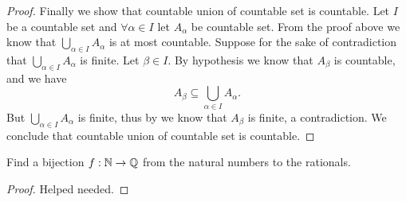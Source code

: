 \begin{proof}
  Finally we show that countable union of countable set is countable.
  Let \(I\) be a countable set and \(\forall \alpha \in I\) let \(A_{\alpha}\) be countable set.
  From the proof above we know that \(\bigcup_{\alpha \in I} A_{\alpha}\) is at most countable.
  Suppose for the sake of contradiction that \(\bigcup_{\alpha \in I} A_{\alpha}\) is finite.
  Let \(\beta \in I\).
  By hypothesis we know that \(A_{\beta}\) is countable, and we have
  \[
    A_{\beta} \subseteq \bigcup_{\alpha \in I} A_{\alpha}.
  \]
  But \(\bigcup_{\alpha \in I} A_{\alpha}\) is finite, thus by  we know that \(A_{\beta}\) is finite, a contradiction.
  We conclude that countable union of countable set is countable.
\end{proof}

\begin{ex}\label{i:ex:8.1.10}
  Find a bijection \(f : \mathbb{N} \to \mathbb{Q}\) from the natural numbers to the rationals.
\end{ex}

\begin{proof}
  Helped needed.
\end{proof}
